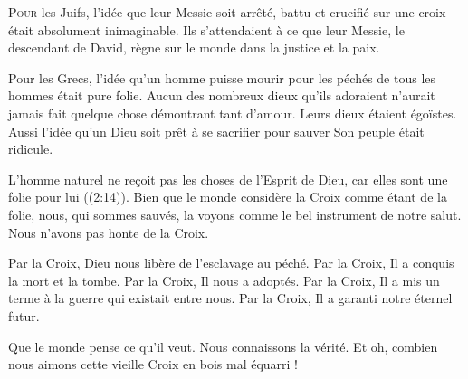 \dvrule







\lettrine{P}{our} les Juifs, l'idée que leur Messie soit arrêté,
 battu et crucifié sur une croix était absolument inimaginable.
 Ils s'attendaient à ce que leur Messie, le descendant de David,
 règne sur le monde dans la justice et la paix.

Pour les Grecs, l'idée qu'un homme puisse mourir pour les péchés
 de tous les hommes était pure folie. Aucun des nombreux dieux
 qu'ils adoraient n'aurait jamais fait quelque chose démontrant tant d'amour.
 Leurs dieux étaient égoïstes. Aussi l'idée qu'un Dieu soit prêt
 à se sacrifier pour sauver Son peuple était ridicule.

\Og L'homme naturel ne re\c{c}oit pas les choses de l'Esprit de Dieu,
 car elles sont une folie pour lui \Fg{} ((2:14)).
 Bien que le monde considère la Croix comme étant de la folie, nous,
 qui sommes sauvés, la voyons comme le bel instrument de notre salut.
 Nous n'avons pas honte de la Croix.


Par la Croix, Dieu nous libère de l'esclavage au péché.
 Par la Croix, Il a conquis la mort et la tombe.
 Par la Croix, Il nous a adoptés.
 Par la Croix, Il a mis un terme à la guerre qui existait entre nous.
 Par la Croix, Il a garanti notre éternel futur.

Que le monde pense ce qu'il veut. Nous connaissons la vérité.
 Et oh, combien nous aimons cette \Og vieille Croix en bois mal équarri \Fg{}!

